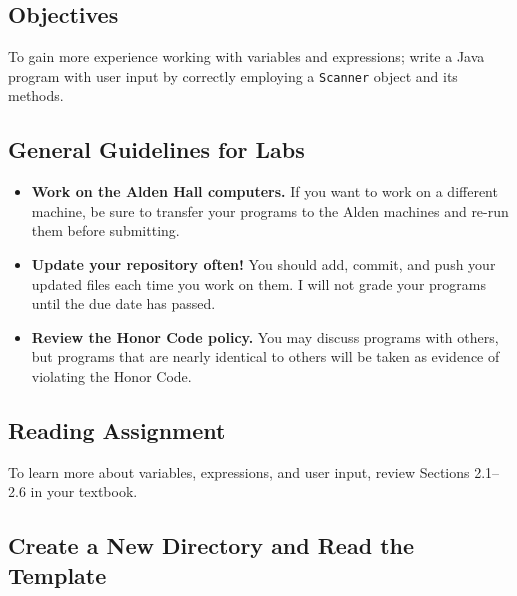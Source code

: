 



\vspace{-0.25in}
\subsection*{Objectives}

To gain more experience working with variables and expressions; write a Java program with user input by correctly
employing a {\tt Scanner} object and its methods.

\vspace{-0.15in}
\subsection*{General Guidelines for Labs}
\begin{itemize}
\item
{\bf Work on the Alden Hall computers.} If you want to work on a different
machine, be sure to transfer your programs to the Alden
machines and re-run them before submitting.
\item
{\bf Update your repository often!} You should add, commit, 
and push your updated files each time you work on them.  I will not grade 
your programs until the due date has passed.
\item
{\bf Review the Honor Code policy.} You
may discuss programs with others, but programs that are nearly identical
to others will be taken as evidence of violating the Honor Code.
\end{itemize}

\vspace{-0.25in}
\subsection*{Reading Assignment}

To learn more about variables, expressions, and user input, review Sections 2.1--2.6 in your textbook. 

\vspace{-0.15in}
\subsection*{Create a New Directory and Read the Template}

